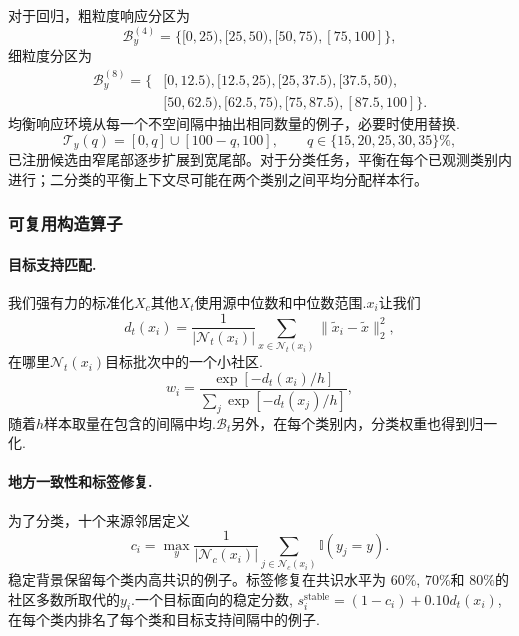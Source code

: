 对于回归，粗粒度响应分区为
\begin{equation}
  \mathcal B_y^{(4)}
  =\{[0,25),[25,50),[50,75),[75,100]\},
  \label{eq:response-quartile-bins}
\end{equation}
细粒度分区为
\begin{equation}
\begin{aligned}
  \mathcal B_y^{(8)}=\{&[0,12.5),[12.5,25),[25,37.5),[37.5,50),\\
                       &[50,62.5),[62.5,75),[75,87.5),[87.5,100]\}.
\end{aligned}
\label{eq:response-octile-bins}
\end{equation}均衡响应环境从每一个不空间隔中抽出相同数量的例子，必要时使用替换.
\begin{equation}
  \mathcal T_y(q)=[0,q]\cup[100-q,100],\qquad
  q\in\{15,20,25,30,35\}\%,
  \label{eq:symmetric-response-tails}
\end{equation}
已注册候选由窄尾部逐步扩展到宽尾部。对于分类任务，平衡在每个已观测类别内进行；二分类的平衡上下文尽可能在两个类别之间平均分配样本行。

\subsubsection{可复用构造算子}

\paragraph{目标支持匹配.}我们强有力的标准化$X_c$其他$X_t$使用源中位数和中位数范围.$x_i$让我们
\begin{equation}
  d_t(x_i)=\frac{1}{|\mathcal N_t(x_i)|}
  \sum_{x\in\mathcal N_t(x_i)}\|\widetilde x_i-\widetilde x\|_2^2,
  \label{eq:target-support-distance}
\end{equation}
在哪里$\mathcal N_t(x_i)$目标批次中的一个小社区.
\begin{equation}
  w_i=\frac{\exp[-d_t(x_i)/h]}{\sum_j\exp[-d_t(x_j)/h]},
  \label{eq:target-matching-weight}
\end{equation}
随着$h$样本取量在包含的间隔中均.$\mathcal B_t$另外，在每个类别内，分类权重也得到归一化.

\paragraph{地方一致性和标签修复.}为了分类，十个来源邻居定义
\begin{equation}
  c_i=\max_y\frac{1}{|\mathcal N_c(x_i)|}
  \sum_{j\in\mathcal N_c(x_i)}\mathbb I(y_j=y).
  \label{eq:local-class-consensus}
\end{equation}
稳定背景保留每个类内高共识的例子。标签修复在共识水平为 $60\%$, $70\%$和 $80\%$的社区多数所取代的$y_i$.一个目标面向的稳定分数, $s_i^{\mathrm{stable}}=(1-c_i)+0.10d_t(x_i)$,在每个类内排名了每个类和目标支持间隔中的例子.


